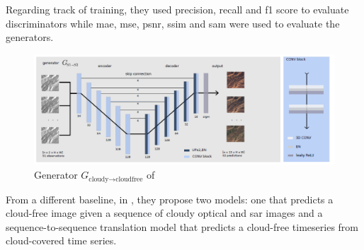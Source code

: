 \documentclass[../main.tex]{subfiles}
\begin{document}
\\\\
Regarding track of training, they used precision, recall and f1 score to evaluate discriminators while \gls{mae}, \gls{mse}, \gls{psnr}, \gls{ssim} and \gls{sam} were used to evaluate the generators.
\begin{figure}[H]
	\centering
	\includegraphics[width=13cm]{imgs/relatedwork/sen12mscr-ts-gen-model}
	\caption{Generator $G_{\text{cloudy} \rightarrow \text{cloudfree}}$ of \cite{sen12mscrts}}
	\label{fig:sen12mscrts-gen}
\end{figure}
From a different baseline, in \cite{sen12mscrts}, they propose two models: one that predicts a cloud-free image given a sequence of cloudy optical and \gls{sar} images and a sequence-to-sequence translation model that predicts a cloud-free timeseries from cloud-covered time series.
\end{document}
